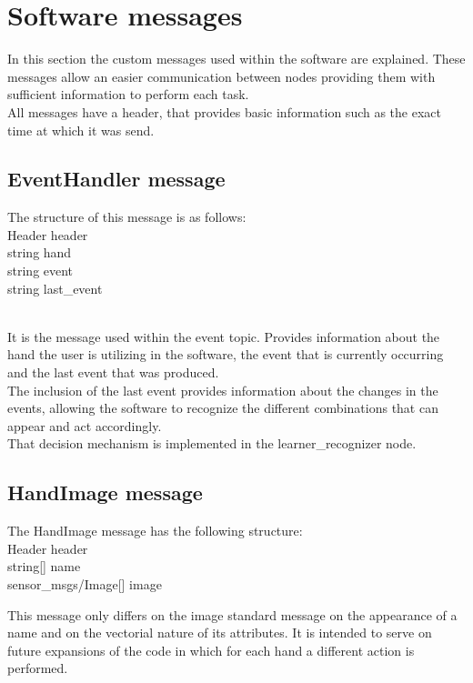 \section{Software messages}
\label{software_messages}

In this section the custom messages used within the software are explained. These messages allow an easier communication between nodes providing them with sufficient information to perform each task. 
\\

All messages have a header, that provides basic information such as the exact time at which it was send. 


\subsection{EventHandler message}
The structure of this message is as follows: \\

Header header\\
string hand\\
string event\\
string last\_event

\\

It is the message used within the event topic. Provides information about the hand the user is utilizing in the software, the event that is currently occurring and the last event that was produced. 
\\

The inclusion of the last event provides information about the changes in the events, allowing the software to recognize the different combinations that can appear and act accordingly. 
\\

That decision mechanism is implemented in the learner\_recognizer node. 

\subsection{HandImage message}

The HandImage message has the following structure: \\
Header header\\
string[] name\\
sensor\_msgs/Image[] image

This message only differs on the image standard message on the appearance of a name and on the vectorial nature of its attributes. It is intended to serve on future expansions of the code in which for each hand a different action is performed. 

